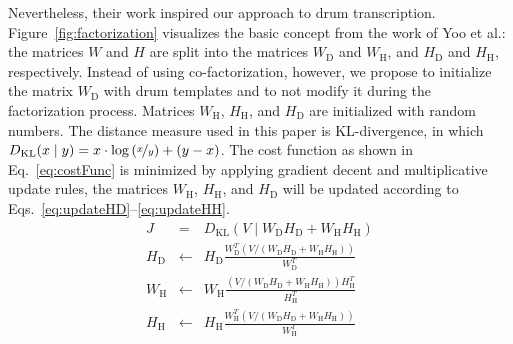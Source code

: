 \documentclass{article}
\newcommand{\figref}[1]{\mbox{Figure~\ref{#1}}}
\begin{document}
Nevertheless, their work inspired our approach to drum transcription. \figref{fig:factorization} visualizes the basic concept from the work of Yoo et al.: the matrices $W$ and $H$ are split into the  matrices $W_\mathrm{D}$ and $W_\mathrm{H}$, and  $H_\mathrm{D}$ and $H_\mathrm{H}$, respectively. Instead of using co-factorization, however, we propose to initialize the matrix $W_\mathrm{D}$ with drum templates and to not modify it during the factorization process. Matrices $W_\mathrm{H}$, $H_\mathrm{H}$, and $H_\mathrm{D}$ are initialized with random numbers. 
The distance measure used in this paper is KL-divergence, in which \(D_\mathrm{KL}(x \mid y) = x\cdot\log\left(\nicefrac{x}{y}\right) + (y - x)\). The cost function as shown in Eq.~\eqref{eq:costFunc} is minimized by applying gradient decent and multiplicative update rules, the matrices  $W_\mathrm{H}$, $H_\mathrm{H}$, and $H_\mathrm{D}$ will be updated according to \mbox{Eqs.~\eqref{eq:updateHD}--\eqref{eq:updateHH}}.  %
\begin{eqnarray}
\label{eq:costFunc}
J &=& D_\mathrm{KL}(V \mid W_\mathrm{D}H_\mathrm{D} + W_\mathrm{H}H_\mathrm{H})\\
\label{eq:updateHD}
H_\mathrm{D} &\leftarrow& H_\mathrm{D}\frac{W_\mathrm{D}^T( V / (W_\mathrm{D}H_\mathrm{D} + W_\mathrm{H}H_\mathrm{H}))}{W_\mathrm{D}^T}\\
%
\label{eq:updateWH}
W_\mathrm{H} &\leftarrow& W_\mathrm{H}\frac{(V/(W_\mathrm{D}H_\mathrm{D} + W_\mathrm{H}H_\mathrm{H})) H_\mathrm{H}^T}{H_\mathrm{H}^T}\\
%
\label{eq:updateHH}
H_\mathrm{H} &\leftarrow& H_\mathrm{H}\frac{W_\mathrm{H}^T (V/(W_\mathrm{D}H_\mathrm{D} + W_\mathrm{H}H_\mathrm{H}))}{W_\mathrm{H}^T}
\end{eqnarray}
\end{document}
